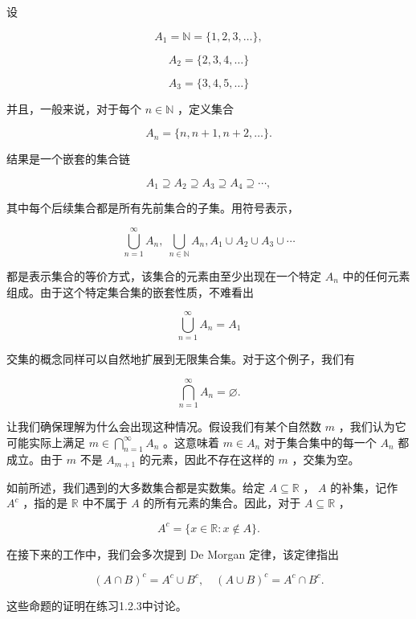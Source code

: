 \begin{Eg}
  \label{eg:1.2.2}
设

\[
{A}_{1} = \mathbb{N} = \{ 1,2,3,\ldots \} ,
\]

\[
{A}_{2} = \{ 2,3,4,\ldots \}
\]

\[
{A}_{3} = \{ 3,4,5,\ldots \}
\]

并且，一般来说，对于每个 \(n \in  \mathbb{N}\) ，定义集合

\[
{A}_{n} = \{ n,n + 1,n + 2,\ldots \} .
\]

结果是一个嵌套的集合链

\[
{A}_{1} \supseteq  {A}_{2} \supseteq  {A}_{3} \supseteq  {A}_{4} \supseteq  \cdots ,
\]

其中每个后续集合都是所有先前集合的子集。用符号表示，

\[
\mathop{\bigcup }\limits_{{n = 1}}^{\infty }{A}_{n},\;\mathop{\bigcup }\limits_{{n \in  \mathbb{N}}}{A}_{n},{A}_{1} \cup  {A}_{2} \cup  {A}_{3} \cup  \cdots
\]

都是表示集合的等价方式，该集合的元素由至少出现在一个特定 \({A}_{n}\) 中的任何元素组成。由于这个特定集合集的嵌套性质，不难看出

\[
\mathop{\bigcup }\limits_{{n = 1}}^{\infty }{A}_{n} = {A}_{1}
\]

交集的概念同样可以自然地扩展到无限集合集。对于这个例子，我们有

\[
\mathop{\bigcap }\limits_{{n = 1}}^{\infty }{A}_{n} = \varnothing .
\]

让我们确保理解为什么会出现这种情况。假设我们有某个自然数 \(m\) ，我们认为它可能实际上满足 \(m \in  \mathop{\bigcap }\limits_{{n = 1}}^{\infty }{A}_{n}\) 。这意味着 \(m \in  {A}_{n}\) 对于集合集中的每一个 \({A}_{n}\) 都成立。由于 \(m\) 不是 \({A}_{m + 1}\) 的元素，因此不存在这样的 \(m\) ，交集为空。  
\end{Eg}

如前所述，我们遇到的大多数集合都是实数集。给定 \(A \subseteq  \mathbb{R}\) ， \(A\) 的补集，记作 \({A}^{c}\) ，指的是 \(\mathbb{R}\) 中不属于 \(A\) 的所有元素的集合。因此，对于 \(A \subseteq  \mathbb{R}\) ，

\[
{A}^{c} = \{ x \in  \mathbb{R} : x \notin  A\} .
\]

在接下来的工作中，我们会多次提到 De Morgan 定律，该定律指出

\[
{\left( A \cap  B\right) }^{c} = {A}^{c} \cup  {B}^{c}, \quad{\left( A \cup  B\right) }^{c} = {A}^{c} \cap  {B}^{c}.
\]

这些命题的证明在练习1.2.3中讨论。

